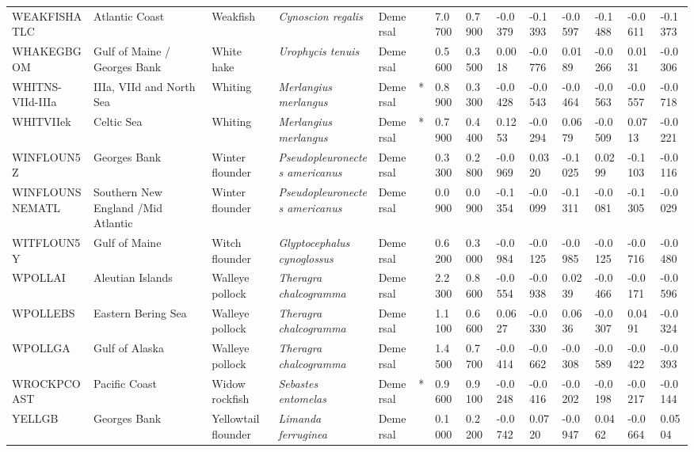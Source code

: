 \begin{longtable}{p{2.6cm}p{1.9cm}p{1.7cm}p{1.6cm}p{1cm}p{0.3cm}p{1cm}p{1cm}p{1cm}p{1.1cm}p{1cm}p{1.1cm}p{1cm}p{1.1cm}}
  WEAKFISHATLC & Atlantic Coast & Weakfish & \textit{Cynoscion regalis} & Demersal &   & 7.0700 & 0.7900 & -0.0379 & -0.1393 & -0.0597 & -0.1488 & -0.0611 & -0.1373 \\ 
  WHAKEGBGOM & Gulf of Maine / Georges Bank & White hake & \textit{Urophycis tenuis} & Demersal &   & 0.5600 & 0.3500 & 0.0018 & -0.0776 & 0.0189 & -0.0266 & 0.0131 & -0.0306 \\ 
  WHITNS-VIId-IIIa & IIIa, VIId and North Sea & Whiting & \textit{Merlangius merlangus} & Demersal & * & 0.8900 & 0.3300 & -0.0428 & -0.0543 & -0.0464 & -0.0563 & -0.0557 & -0.0718 \\ 
  WHITVIIek & Celtic Sea & Whiting & \textit{Merlangius merlangus} & Demersal & * & 0.7900 & 0.4400 & 0.1253 & -0.0294 & 0.0679 & -0.0509 & 0.0713 & -0.0221 \\ 
  WINFLOUN5Z & Georges Bank & Winter flounder & \textit{Pseudopleuronectes americanus} & Demersal &   & 0.3300 & 0.2800 & -0.0969 & 0.0320 & -0.1025 & 0.0299 & -0.1103 & -0.0116 \\ 
  WINFLOUNSNEMATL & Southern New England /Mid Atlantic & Winter flounder & \textit{Pseudopleuronectes americanus} & Demersal &   & 0.0900 & 0.0900 & -0.1354 & -0.0099 & -0.1311 & -0.0081 & -0.1305 & -0.0029 \\ 
  WITFLOUN5Y & Gulf of Maine & Witch flounder & \textit{Glyptocephalus cynoglossus} & Demersal &   & 0.6200 & 0.3000 & -0.0984 & -0.0125 & -0.0985 & -0.0125 & -0.0716 & -0.0480 \\ 
  WPOLLAI & Aleutian Islands & Walleye pollock & \textit{Theragra chalcogramma} & Demersal &   & 2.2300 & 0.8600 & -0.0554 & -0.0938 & 0.0239 & -0.0466 & -0.0171 & -0.0596 \\ 
  WPOLLEBS & Eastern Bering Sea & Walleye pollock & \textit{Theragra chalcogramma} & Demersal &   & 1.1100 & 0.6600 & 0.0627 & -0.0330 & 0.0636 & -0.0307 & 0.0491 & -0.0324 \\ 
  WPOLLGA & Gulf of Alaska & Walleye pollock & \textit{Theragra chalcogramma} & Demersal &   & 1.4500 & 0.7700 & -0.0414 & -0.0662 & -0.0308 & -0.0589 & -0.0422 & -0.0393 \\ 
  WROCKPCOAST & Pacific Coast & Widow rockfish & \textit{Sebastes entomelas} & Demersal & * & 0.9600 & 0.9100 & -0.0248 & -0.0416 & -0.0202 & -0.0198 & -0.0217 & -0.0144 \\ 
  YELLGB & Georges Bank & Yellowtail flounder & \textit{Limanda ferruginea} & Demersal &   & 0.1000 & 0.2200 & -0.0742 & 0.0720 & -0.0947 & 0.0462 & -0.0664 & 0.0504 \\ 

\end{longtable}
